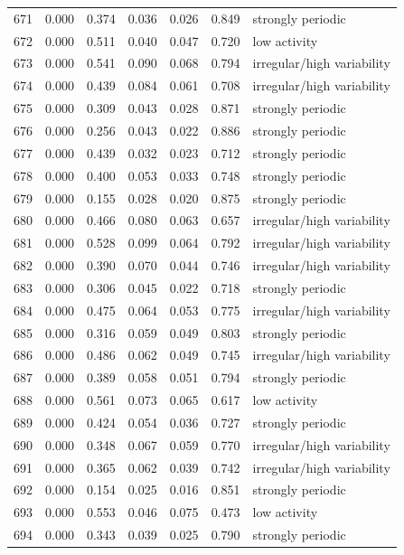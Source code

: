 \begin{longtable}{lrrrrrl}
671 & 0.000 & 0.374 & 0.036 & 0.026 & 0.849 & strongly periodic \\
672 & 0.000 & 0.511 & 0.040 & 0.047 & 0.720 & low activity \\
673 & 0.000 & 0.541 & 0.090 & 0.068 & 0.794 & irregular/high variability \\
674 & 0.000 & 0.439 & 0.084 & 0.061 & 0.708 & irregular/high variability \\
675 & 0.000 & 0.309 & 0.043 & 0.028 & 0.871 & strongly periodic \\
676 & 0.000 & 0.256 & 0.043 & 0.022 & 0.886 & strongly periodic \\
677 & 0.000 & 0.439 & 0.032 & 0.023 & 0.712 & strongly periodic \\
678 & 0.000 & 0.400 & 0.053 & 0.033 & 0.748 & strongly periodic \\
679 & 0.000 & 0.155 & 0.028 & 0.020 & 0.875 & strongly periodic \\
680 & 0.000 & 0.466 & 0.080 & 0.063 & 0.657 & irregular/high variability \\
681 & 0.000 & 0.528 & 0.099 & 0.064 & 0.792 & irregular/high variability \\
682 & 0.000 & 0.390 & 0.070 & 0.044 & 0.746 & irregular/high variability \\
683 & 0.000 & 0.306 & 0.045 & 0.022 & 0.718 & strongly periodic \\
684 & 0.000 & 0.475 & 0.064 & 0.053 & 0.775 & irregular/high variability \\
685 & 0.000 & 0.316 & 0.059 & 0.049 & 0.803 & strongly periodic \\
686 & 0.000 & 0.486 & 0.062 & 0.049 & 0.745 & irregular/high variability \\
687 & 0.000 & 0.389 & 0.058 & 0.051 & 0.794 & strongly periodic \\
688 & 0.000 & 0.561 & 0.073 & 0.065 & 0.617 & low activity \\
689 & 0.000 & 0.424 & 0.054 & 0.036 & 0.727 & strongly periodic \\
690 & 0.000 & 0.348 & 0.067 & 0.059 & 0.770 & irregular/high variability \\
691 & 0.000 & 0.365 & 0.062 & 0.039 & 0.742 & irregular/high variability \\
692 & 0.000 & 0.154 & 0.025 & 0.016 & 0.851 & strongly periodic \\
693 & 0.000 & 0.553 & 0.046 & 0.075 & 0.473 & low activity \\
694 & 0.000 & 0.343 & 0.039 & 0.025 & 0.790 & strongly periodic \\

\end{longtable}
